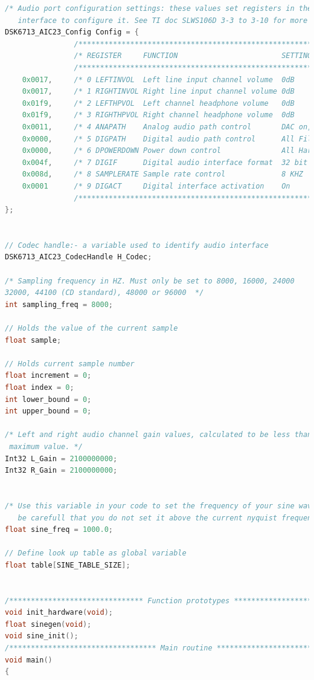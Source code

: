 \documentclass{article}
\begin{document}
\begin{lstlisting}[language=C, caption=Full Code Listing]
/* Audio port configuration settings: these values set registers in the AIC23 audio 
   interface to configure it. See TI doc SLWS106D 3-3 to 3-10 for more info. */
DSK6713_AIC23_Config Config = {
                /**********************************************************************/
                /* REGISTER     FUNCTION                        SETTINGS              */ 
                /**********************************************************************/
    0x0017,     /* 0 LEFTINVOL  Left line input channel volume  0dB                   */
    0x0017,     /* 1 RIGHTINVOL Right line input channel volume 0dB                   */
    0x01f9,     /* 2 LEFTHPVOL  Left channel headphone volume   0dB                   */
    0x01f9,     /* 3 RIGHTHPVOL Right channel headphone volume  0dB                   */
    0x0011,     /* 4 ANAPATH    Analog audio path control       DAC on, Mic boost 20dB*/
    0x0000,     /* 5 DIGPATH    Digital audio path control      All Filters off       */
    0x0000,     /* 6 DPOWERDOWN Power down control              All Hardware on       */
    0x004f,     /* 7 DIGIF      Digital audio interface format  32 bit                */
    0x008d,     /* 8 SAMPLERATE Sample rate control             8 KHZ                 */
    0x0001      /* 9 DIGACT     Digital interface activation    On                    */
                /**********************************************************************/
};


// Codec handle:- a variable used to identify audio interface
DSK6713_AIC23_CodecHandle H_Codec;

/* Sampling frequency in HZ. Must only be set to 8000, 16000, 24000
32000, 44100 (CD standard), 48000 or 96000  */
int sampling_freq = 8000;

// Holds the value of the current sample 
float sample;

// Holds current sample number
float increment = 0;
float index = 0;
int lower_bound = 0;
int upper_bound = 0;

/* Left and right audio channel gain values, calculated to be less than signed 32 bit
 maximum value. */
Int32 L_Gain = 2100000000;
Int32 R_Gain = 2100000000;


/* Use this variable in your code to set the frequency of your sine wave 
   be carefull that you do not set it above the current nyquist frequency! */
float sine_freq = 1000.0; 

// Define look up table as global variable
float table[SINE_TABLE_SIZE];
     

/******************************* Function prototypes ********************************/
void init_hardware(void);
float sinegen(void);
void sine_init();
/********************************** Main routine ************************************/
void main()
{


\end{lstlisting}
\end{document}
